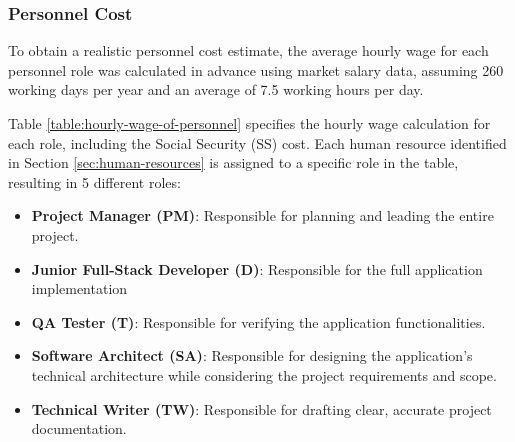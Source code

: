 \subsubsection{Personnel Cost}

To obtain a realistic personnel cost estimate, the average hourly wage for each personnel role was calculated in advance using market salary data\cite{annual-spain-salary}, assuming 260 working days per year and an average of 7.5 working hours per day.

Table  \ref{table:hourly-wage-of-personnel} specifies the hourly wage calculation for each role, including the Social Security (SS) cost. Each human resource identified in Section \ref{sec:human-resources} is assigned to a specific role in the table, resulting in 5 different roles:

\small
\begin{itemize} [leftmargin=0.75cm, noitemsep]
    \item \textbf{Project Manager (PM)}: Responsible for planning and leading the entire project.
    \item \textbf{Junior Full-Stack Developer (D)}: Responsible for the full application implementation
    \item \textbf{QA Tester (T)}: Responsible for verifying the application functionalities.
    \item \textbf{Software Architect (SA)}: Responsible for designing the application's technical architecture while considering the project requirements and scope.
    \item \textbf{Technical Writer (TW)}: Responsible for drafting clear, accurate project documentation.
\end{itemize}

\vspace{-10pt}

\normalsize

